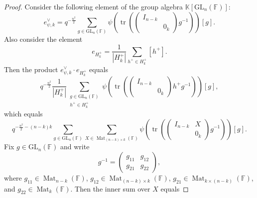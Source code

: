 \documentclass[12pt, reqno]{amsart}
\theoremstyle{definition}
\newcommand{\coefficientsField}{\mathbb{K}}
\newcommand{\sizeof}[1]{\left|#1\right|}
\newcommand{\fieldCharacter}{\psi}
\newcommand{\IdentityMatrix}[1]{I_{#1}}
\newcommand{\trace}{\operatorname{tr}}
\newcommand{\GL}{\mathrm{GL}}
\newcommand{\Mat}[2]{\operatorname{Mat}_{#1 \times #2}}
\newcommand{\finiteField}{\mathbb{F}}
\newcommand{\squareMatrix}{\operatorname{Mat}}
\begin{document}
\begin{proof}
		Consider the following element of the group algebra $\coefficientsField\left[\GL_n\left(\finiteField\right)\right]$:
		\begin{displaymath}
		e_{\fieldCharacter, k}^{\vee} = q^{-\frac{n^2}{2}} \sum_{g \in \GL_n\left(\finiteField\right)} \fieldCharacter\left(\trace \left(\begin{pmatrix}
			\IdentityMatrix{n-k}\\
			& 0_k
		\end{pmatrix}g^{-1}\right)\right)\left[g\right].
		\end{displaymath}
		Also consider the element
		\begin{displaymath}
		e_{H^+_k} = \frac{1}{\sizeof{H_k^{+}}}\sum_{h^+ \in H^{+}_k} \left[h^{+}\right].
		\end{displaymath}
		Then the product $e_{\fieldCharacter, k}^{\vee} \cdot e_{H^+_k}$ equals
		\begin{displaymath}
		q^{-\frac{n^2}{2}} \frac{1}{\sizeof{H_k^{+}}} \sum_{\substack{g \in \GL_n\left(\finiteField\right)\\
				h^+ \in H^{+}_k}} \fieldCharacter\left(\trace \left(\begin{pmatrix}
			\IdentityMatrix{n-k}\\
			& 0_k
		\end{pmatrix} h^{+} g^{-1}\right)\right)\left[g\right],
		\end{displaymath}
		which equals
		\begin{displaymath}
		q^{-\frac{n^2}{2}-\left(n-k\right)k} \sum_{g \in \GL_n\left(\finiteField\right)} \sum_{X \in \Mat{\left(n-k\right)}{k}\left(\finiteField\right)} \fieldCharacter\left(\trace \left(\begin{pmatrix}
			\IdentityMatrix{n-k} & X\\
			& 0_{k}
		\end{pmatrix} g^{-1} \right)\right) \left[g\right].
		\end{displaymath}
		Fix $g \in \GL_n\left(\finiteField\right)$ and write
		\begin{displaymath}
		g^{-1} = \begin{pmatrix}
			g_{11} & g_{12}\\
			g_{21} & g_{22}
		\end{pmatrix},
		\end{displaymath}
		where $g_{11} \in \squareMatrix_{n-k}\left(\finiteField\right)$, $g_{12} \in \Mat{\left(n-k\right)}{k}\left(\finiteField\right)$, $g_{21} \in \Mat{k}{\left(n-k\right)}\left(\finiteField\right)$, and $g_{22} \in \squareMatrix_{k}\left(\finiteField\right)$. Then the inner sum over $X$ equals

\end{proof}
\end{document}
